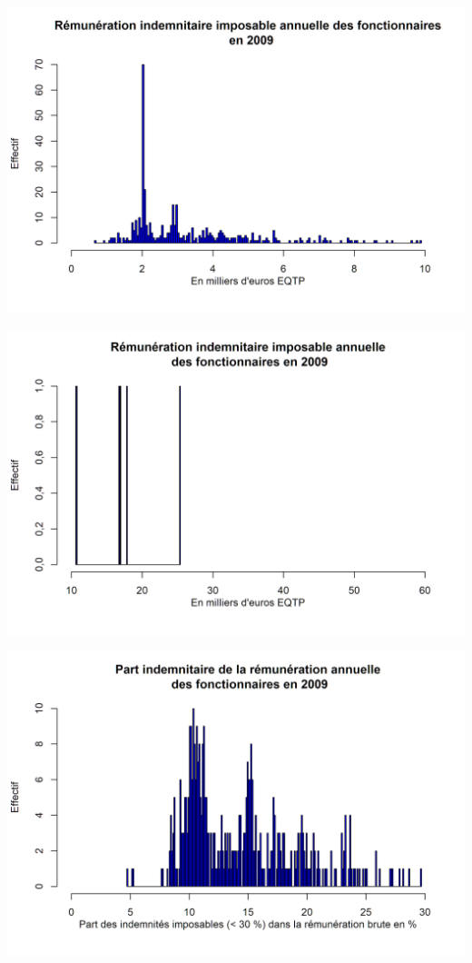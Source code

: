 \includegraphics{altair_files/figure-latex/unnamed-chunk-43-3.png}

\includegraphics{altair_files/figure-latex/unnamed-chunk-43-4.png}

\includegraphics{altair_files/figure-latex/unnamed-chunk-43-5.png}


